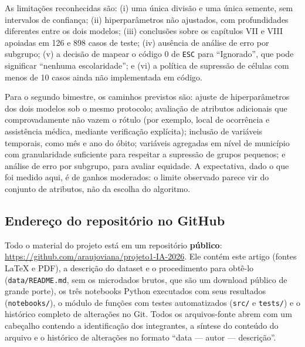 \documentclass[12pt]{article}
\begin{document}
As limitações reconhecidas são: (i) uma única divisão e uma única semente, sem
intervalos de confiança; (ii) hiperparâmetros não ajustados, com profundidades
diferentes entre os dois modelos; (iii) conclusões sobre os capítulos VII e
VIII apoiadas em 126 e 898 casos de teste; (iv) ausência de análise de erro por
subgrupo; (v) a decisão de mapear o código 0 de \texttt{ESC} para ``Ignorado'',
que pode significar ``nenhuma escolaridade''; e (vi) a política de supressão de
células com menos de 10 casos ainda não implementada em código.

Para o segundo bimestre, os caminhos previstos são: ajuste de hiperparâmetros
dos dois modelos sob o mesmo protocolo; avaliação de atributos adicionais que
comprovadamente não vazem o rótulo (por exemplo, local de ocorrência e
assistência médica, mediante verificação explícita); inclusão de variáveis
temporais, como mês e ano do óbito; variáveis agregadas em nível de município
com granularidade suficiente para respeitar a supressão de grupos pequenos; e
análise de erro por subgrupo, para avaliar equidade. A expectativa, dado o que
foi medido aqui, é de ganhos moderados: o limite observado parece vir do
conjunto de atributos, não da escolha do algoritmo.

\subsection{Endereço do repositório no GitHub}

Todo o material do projeto está em um repositório \textbf{público}:
\url{https://github.com/araujoviana/projeto1-IA-2026}. Ele contém este artigo
(fontes LaTeX e PDF), a descrição do dataset e o procedimento para obtê-lo
(\texttt{data/README.md}, sem os microdados brutos, que são um download
público de grande porte), os três notebooks Python executados com seus
resultados (\texttt{notebooks/}), o módulo de funções com testes
automatizados (\texttt{src/} e \texttt{tests/}) e o histórico completo de
alterações no Git. Todos os arquivos-fonte abrem com um cabeçalho contendo a
identificação dos integrantes, a síntese do conteúdo do arquivo e o histórico
de alterações no formato ``data --- autor --- descrição''.



\end{document}
